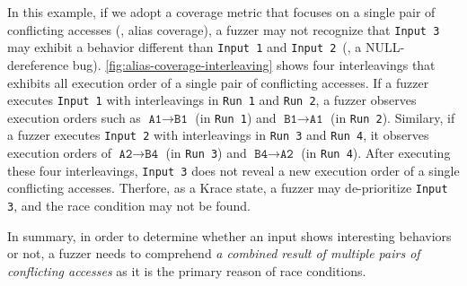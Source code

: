In this example, if we adopt a coverage metric that focuses on a
single pair of conflicting accesses (\eg, alias coverage), a fuzzer
may not recognize that \texttt{Input 3} may exhibit a behavior
different than \texttt{Input 1} and \texttt{Input 2}~(\ie, a
NULL-dereference bug).
%
\autoref{fig:alias-coverage-interleaving} shows four interleavings
that exhibits all execution order of a single pair of conflicting
accesses. If a fuzzer executes \texttt{Input 1} with interleavings in
\texttt{Run 1} and \texttt{Run 2}, a fuzzer observes execution orders
such as $\texttt{A1} \rightarrow \texttt{B1}$ (in \texttt{Run 1}) and
$\texttt{B1} \rightarrow \texttt{A1}$ (in \texttt{Run 2}).
%
Similary, if a fuzzer executes \texttt{Input 2} with interleavings in
\texttt{Run 3} and \texttt{Run 4}, it observes execution orders of
$\texttt{A2} \rightarrow \texttt{B4}$ (in \texttt{Run 3}) and
$\texttt{B4} \rightarrow \texttt{A2}$ (in \texttt{Run 4}).
%
After executing these four interleavings, \texttt{Input 3} does not
reveal a new execution order of a single conflicting
accesses. Therfore, as a Krace state, a fuzzer may de-prioritize
\texttt{Input 3}, and the race condition may not be found.

In summary, in order to determine whether an input shows interesting
behaviors or not, a fuzzer needs to comprehend \textit{a combined
  result of multiple pairs of conflicting accesses} as it is the
primary reason of race conditions.



